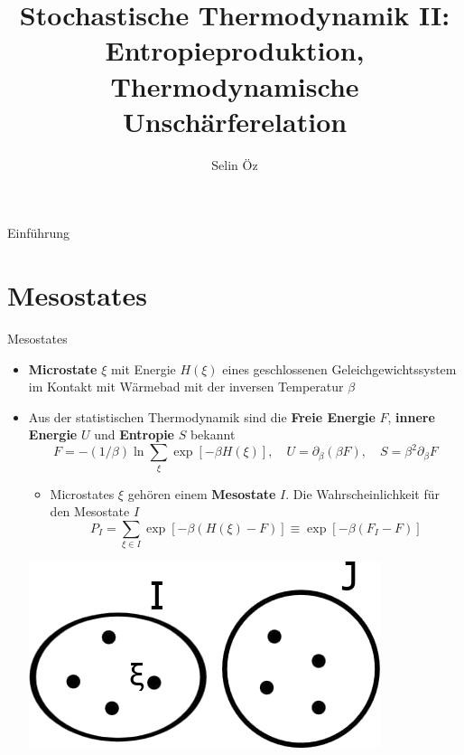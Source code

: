 \documentclass[aspectratio=1610, 9pt]{beamer}
\title{Stochastische Thermodynamik II: Entropieproduktion, Thermodynamische Unschärferelation}
\author[S.~Öz]{Selin Öz}
\institute{AG Kierfeld\\ Fakultät Physik}
\begin{document}
\maketitle


\begin{frame}{Einführung}
  \tableofcontents
\end{frame}

\section{Mesostates}
\begin{frame}{Mesostates}%
    \begin{itemize}
      \item \textbf{Microstate}  $\xi$ mit Energie $ H \left(\xi \right) $ eines geschlossenen Geleichgewichtssystem im Kontakt mit Wärmebad mit der inversen Temperatur $\beta$
      \item Aus der statistischen Thermodynamik sind die \textbf{Freie Energie} $F$, \textbf{innere Energie} $U$ und \textbf{Entropie} $S$ bekannt 
      \begin{equation*}
        F=-(1 / \beta )\ln\sum_{\xi}\exp[-\beta H(\xi)], \quad U=\partial_{\beta}(\beta F), \quad S = \beta^2 \partial_\beta F
      \end{equation*}
      \hspace{-20pt}
      \begin{minipage}[t]{0.7\textwidth}
        \begin{itemize}
        \item Microstates $\xi$ gehören einem \textbf{Mesostate} $I$. Die Wahrscheinlichkeit für den Mesostate $I$
        \begin{equation*}
        P_I=  \sum_{\xi \in I} \exp[-\beta \left( H(\xi) - F\right) ] \equiv \exp[-\beta \left( F_I - F\right) ]
        \end{equation*}
        \end{itemize}
      \end{minipage}
      \hfill
      \begin{minipage}{0.25\textwidth}
        \begin{center}
          \includegraphics{images/mesostates.png}

\end{center}
\end{minipage}
\end{itemize}
\end{frame}
\end{document}
